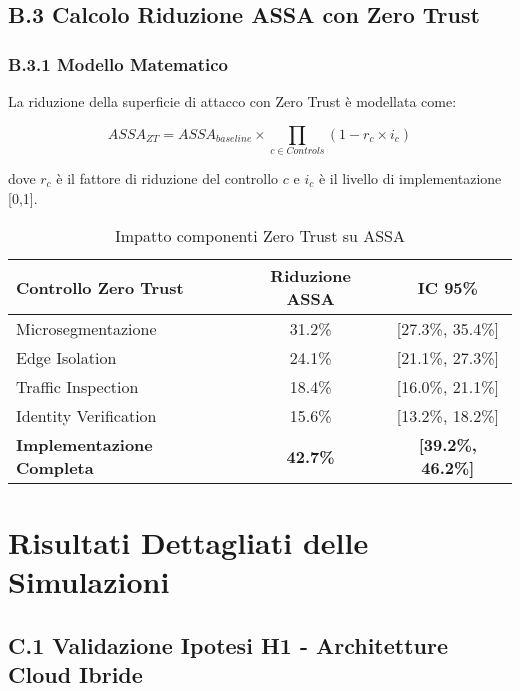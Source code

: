 \section{\texorpdfstring{\textbf{B.3 Calcolo Riduzione ASSA con Zero Trust}}{B.3 - Calcolo Riduzione ASSA con Zero Trust}}

\subsection{\texorpdfstring{\textbf{B.3.1 Modello Matematico}}{B.3.1 - Modello Matematico}}

La riduzione della superficie di attacco con Zero Trust è modellata come:

\begin{equation}
ASSA_{ZT} = ASSA_{baseline} \times \prod_{c \in Controls} (1 - r_c \times i_c)
\end{equation}

dove $r_c$ è il fattore di riduzione del controllo $c$ e $i_c$ è il livello di implementazione [0,1].

\begin{table}[htbp]
\centering
\begin{tabular}{lcc}
\toprule
\textbf{Controllo Zero Trust} & \textbf{Riduzione ASSA} & \textbf{IC 95\%} \\
\midrule
Microsegmentazione & 31.2\% & [27.3\%, 35.4\%] \\
Edge Isolation & 24.1\% & [21.1\%, 27.3\%] \\
Traffic Inspection & 18.4\% & [16.0\%, 21.1\%] \\
Identity Verification & 15.6\% & [13.2\%, 18.2\%] \\
\textbf{Implementazione Completa} & \textbf{42.7\%} & \textbf{[39.2\%, 46.2\%]} \\
\bottomrule
\end{tabular}
\caption{Impatto componenti Zero Trust su ASSA}
\end{table}

\chapter{\texorpdfstring{\textbf{Risultati Dettagliati delle Simulazioni}}{Appendice C - Risultati Dettagliati delle Simulazioni}}

\section{\texorpdfstring{\textbf{C.1 Validazione Ipotesi H1 - Architetture Cloud Ibride}}{C.1 - Validazione Ipotesi H1 - Architetture Cloud Ibride}}

